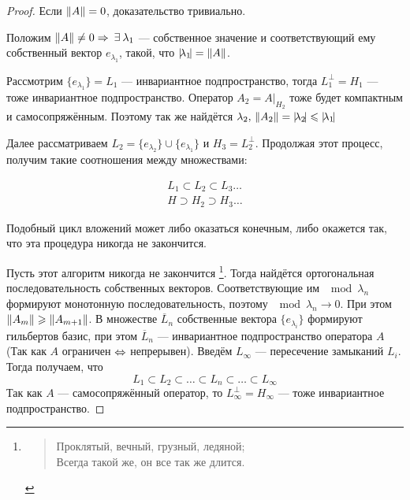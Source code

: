 \documentclass[12pt]{article}
\begin{document}
	\begin{proof}
		Если $\left\| A \right\| = 0$, доказательство тривиально.
		
		Положим $\norm{A} \neq 0 \Rightarrow \exists \lambda_1$ --- собственное значение и соответствующий ему 
		собственный вектор $e_{\lambda_1}$, такой, что $|\! \lambda_1 \!| = \left\| A \right\|$.
		
		Рассмотрим $\{e_{\lambda_1}\} = L_1$ --- инвариантное подпространство, тогда $L_1^{\perp} = H_1$ --- тоже инвариантное 
		подпространство. Оператор $A_2 = A|_{H_2}$ тоже будет компактным и самосопряжённым. Поэтому так же найдётся
		$\lambda_2,\, \left\| A_2 \right\| = |\! \lambda_2 \!| \leqslant |\! \lambda_1 \!|$
		
		Далее рассматриваем $L_2 = \{e_{\lambda_2}\} \cup \{e_{\lambda_1}\}$ и $H_3 = L_2^{\perp}$. Продолжая этот 
		процесс, получим такие соотношения между множествами:
		
		\begin{gather*}
			L_1 \subset L_2 \subset L_3 \dots \\
			H \supset H_2 \supset H_3 \dots
		\end{gather*}
		
		Подобный цикл вложений может либо оказаться конечным, либо окажется так, что эта процедура никогда не закончится.
		
		Пусть этот алгоритм никогда не закончится
		\footnote{
			\begin{verse}
				Проклятый, вечный, грузный, ледяной; \\
				Всегда такой же, он все так же длится.
			\end{verse}
		}.
		Тогда найдётся ортогональная последовательность собственных векторов. Соответствующие им $\mod{\lambda_n}$ 
		формируют монотонную последовательность, поэтому $\mod{\lambda_n} \rightarrow 0$. При этом 
		$\left\| A_m \right\| \geqslant \left\| A_{m+1} \right\|$. В множестве $\overline{L}_n$ собственные вектора $\{e_{\lambda_i}\}$ 
		формируют гильбертов базис, при этом $\overline{L}_n$ --- инвариантное подпространство оператора
		$A$ (Так как $A$ ограничен $\Leftrightarrow$ непрерывен). Введём $L_{\infty}$ --- пересечение замыканий $L_i$. Тогда 
		получаем, что
		$$L_1 \subset L_2 \subset \dots \subset L_n \subset \dots \subset L_{\infty}$$
		Так как $A$ --- самосопряжённый оператор, то $L^{\perp}_{\infty} = H_{\infty}$ --- тоже инвариантное 
		подпространство.
	\end{proof}
\end{document}
